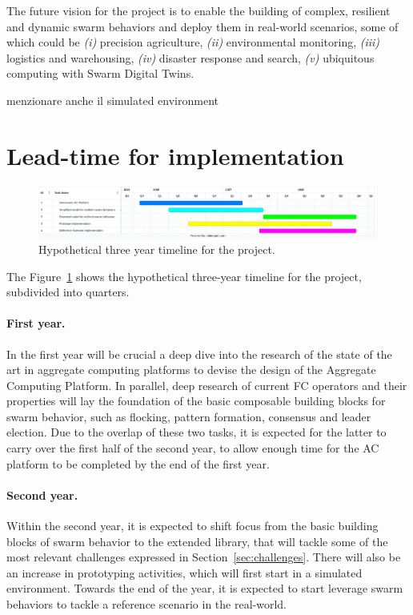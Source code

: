 \documentclass[12pt]{article}
\begin{document}
The future vision for the project is to enable the building of complex, resilient and dynamic swarm behaviors and deploy them in real-world scenarios, some of which could be \textit{(i)} precision agriculture,
\textit{(ii)} environmental monitoring, \textit{(iii)} logistics and warehousing, \textit{(iv)} disaster response and search, 
\textit{(v)} ubiquitous computing with Swarm Digital Twins.

menzionare anche il simulated environment
\section{Lead-time for implementation}
\begin{figure}
	\includegraphics[width=\linewidth]{figures/timeline.png}
	\caption{Hypothetical three year timeline for the project.}
	\label{fig:timeline}
\end{figure}

The Figure~\ref{fig:timeline} shows the hypothetical three-year timeline for the project, subdivided into quarters.

\paragraph{First year.} In the first year will be crucial a deep dive into the research of the state of the art in aggregate computing platforms to devise the design of the Aggregate Computing Platform.
In parallel, deep research of current FC operators and their properties will lay the foundation of the basic composable building blocks for swarm behavior, such as flocking, pattern formation, consensus and leader election.
Due to the overlap of these two tasks, it is expected for the latter to carry over the first half of the second year, to allow enough time for the AC platform to be completed by the end of the first year.

\paragraph{Second year.} Within the second year, it is expected to shift focus from the basic building blocks of swarm behavior to the extended library, that will tackle some of the most relevant challenges expressed in Section~\ref{sec:challenges}.
There will also be an increase in prototyping activities, which will first start in a simulated environment.
Towards the end of the year, it is expected to start leverage swarm behaviors to tackle a reference scenario in the real-world.
\end{document}
